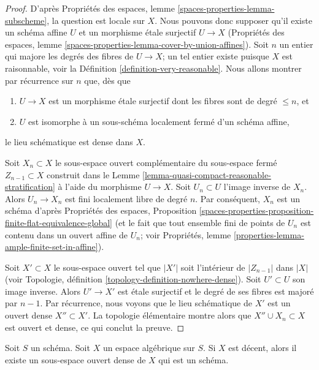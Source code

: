 \begin{proof}
D'après Propriétés des espaces,
lemme \ref{spaces-properties-lemma-subscheme},
la question est locale sur $X$. Nous pouvons donc supposer qu'il existe un
schéma affine $U$ et un morphisme étale surjectif $U \to X$
(Propriétés des espaces, lemme
\ref{spaces-properties-lemma-cover-by-union-affines}).
Soit $n$ un entier qui majore les degrés des fibres de $U \to X$;
un tel entier existe puisque $X$ est raisonnable, voir la
Définition \ref{definition-very-reasonable}.
Nous allons montrer par récurrence sur $n$ que, dès que
\begin{enumerate}
\item $U \to X$ est un morphisme étale surjectif dont les fibres sont de
degré $\leq n$, et
\item $U$ est isomorphe à un sous-schéma localement fermé d'un schéma affine,
\end{enumerate}
le lieu schématique est dense dans $X$.

\medskip\noindent
Soit $X_n \subset X$ le sous-espace ouvert complémentaire du sous-espace
fermé $Z_{n - 1} \subset X$ construit dans le
Lemme \ref{lemma-quasi-compact-reasonable-stratification}
à l'aide du morphisme $U \to X$.
Soit $U_n \subset U$ l'image inverse de $X_n$. Alors
$U_n \to X_n$ est fini localement libre de degré $n$.
Par conséquent, $X_n$ est un schéma d'après
Propriétés des espaces, Proposition
\ref{spaces-properties-proposition-finite-flat-equivalence-global}
(et le fait que tout ensemble fini de points de $U_n$ est contenu dans un
ouvert affine de $U_n$; voir
Propriétés, lemme \ref{properties-lemma-ample-finite-set-in-affine}).

\medskip\noindent
Soit $X' \subset X$ le sous-espace ouvert tel que $|X'|$ soit l'intérieur de
$|Z_{n - 1}|$ dans $|X|$ (voir
Topologie, définition \ref{topology-definition-nowhere-dense}).
Soit $U' \subset U$ son image inverse. Alors $U' \to X'$ est étale surjectif
et le degré de ses fibres est majoré par $n - 1$. Par récurrence, nous voyons
que le lieu schématique de $X'$ est un ouvert dense $X'' \subset X'$.
La topologie élémentaire montre alors que $X'' \cup X_n \subset X$ est
ouvert et dense, ce qui conclut la preuve.
\end{proof}

\begin{theorem}
\label{theorem-decent-open-dense-scheme}
Soit $S$ un schéma. Soit $X$ un espace algébrique sur $S$.
Si $X$ est décent, alors il existe un sous-espace ouvert dense de $X$ qui est
un schéma.
\end{theorem}

